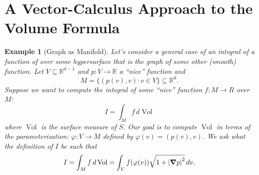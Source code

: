 \documentclass{article}
\newcommand{\R}{\mathbb{R}}
\theoremstyle{theorem}
\newtheorem{example}[theorem]{Example}
\newcommand{\Vol}{\operatorname{Vol}}
\begin{document}
\section{A Vector-Calculus Approach to the Volume Formula}

\begin{example}[Graph as Manifold]
Let's consider a general case of an integral of a function of over some hypersurface that is the graph of some other (smooth) function. Let $V \subseteq \R^{d-1}$ and $p: V \to \R$ a ``nice'' function and 
\begin{equation*}
    M = \{ (p(v),v) : v \in V \} \subseteq \R^d.
\end{equation*}
Suppose we want to compute the integral of some ``nice'' function $f : M \to R$ over $M$:
\begin{equation*}
    I = \int_M f\,d\Vol
\end{equation*}
where $\Vol$ is the surface measure of $S$. Our goal is to compute $\Vol$ in terms of the parameterization: $\varphi: V \to M $ defined by $\varphi(v) = (p(v), v)$. 
We ask what the definition of $I$ be such that 
\begin{equation*}
    I = \int_M f\,d\Vol = \int_V f(\varphi(v)) \sqrt{1+ \abs{\grad p}^2}\,dv. 
\end{equation*}
\end{example}
\end{document}

